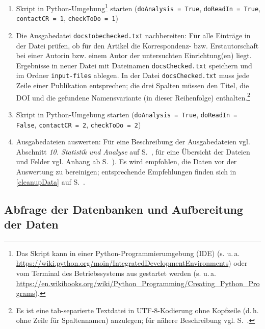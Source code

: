 \begin{enumerate}
\begin{compactitem}
	\end{compactitem}
\item \label{runscript} Skript in Python-Umgebung\footnote{Das Skript kann in einer Python-Programmierumgebung (IDE) (s. u.\,a. \url{https://wiki.python.org/moin/IntegratedDevelopmentEnvironments}) oder vom Terminal des Betriebssystems aus gestartet werden (s. u.\,a. \url{https://en.wikibooks.org/wiki/Python_Programming/Creating_Python_Programs}).} starten \newline
(\texttt{doAnalysis = True}, \texttt{doReadIn = True}, \texttt{contactCR = 1}, \texttt{checkToDo = 1})
\item Die Ausgabedatei \texttt{docstobechecked.txt} nachbereiten: Für alle Einträge in der Datei prüfen, ob für den Artikel die Korrespondenz- bzw. Erstautorschaft bei einer Autorin bzw. einem Autor der untersuchten Einrichtung(en) liegt. Ergebnisse in neuer Datei mit Dateinamen \texttt{docsChecked.txt} speichern und im  Ordner \texttt{input-files} ablegen. In der Datei \texttt{docsChecked.txt} muss jede Zeile einer Publikation entsprechen; die drei Spalten müssen den Titel, die DOI und die gefundene Namensvariante (in dieser Reihenfolge) enthalten.\footnote{Es ist eine tab-separierte Textdatei in UTF-8-Kodierung ohne Kopfzeile (d.\,h. ohne Zeile für Spaltennamen) anzulegen; für nähere Beschreibung vgl. S.~\pageref{func-corr-author}.}

\item \label{runscript2} Skript in Python-Umgebung starten \newline
(\texttt{doAnalysis = True}, \texttt{doReadIn = False}, \texttt{contactCR = 2}, \texttt{checkToDo = 2})

\item Ausgabedateien auswerten: Für eine Beschreibung der Ausgabedateien vgl. Abschnitt \textit{10. Statistik und Analyse} auf S.~\pageref{analyse}, für eine Übersicht der Dateien und Felder vgl. Anhang ab S.~\pageref{appendix}). Es wird empfohlen, die Daten vor der Auswertung zu bereinigen; entsprechende Empfehlungen finden sich in \ref{cleanupData} auf S.~\pageref{cleanupData}.
\end{enumerate}

\subsection{Abfrage der Datenbanken und Aufbereitung der Daten}
\label{Datenerhebung}

